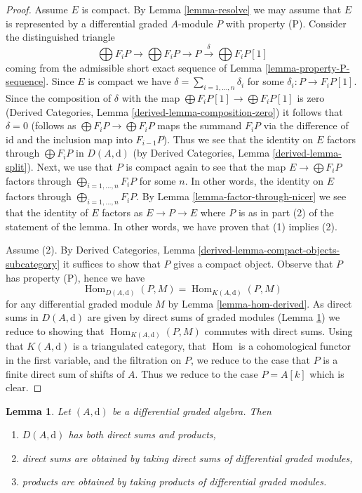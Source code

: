 \documentclass{stacks-project}
\theoremstyle{plain}
\newtheorem{lemma}[subsection]{Lemma}
\theoremstyle{definition}
\theoremstyle{remark}
\numberwithin{equation}{subsection}
\def\Hom{\mathop{\mathrm{Hom}}\nolimits}
\begin{document}
\begin{proof}
Assume $E$ is compact. By Lemma \ref{lemma-resolve} we may assume that $E$
is represented by a differential graded $A$-module $P$ with property (P).
Consider the distinguished triangle
$$
\bigoplus F_iP \to \bigoplus F_iP \to P
\xrightarrow{\delta} \bigoplus F_iP[1]
$$
coming from the admissible short exact sequence of
Lemma \ref{lemma-property-P-sequence}. Since $E$ is compact we have
$\delta = \sum_{i = 1, \ldots, n} \delta_i$ for some
$\delta_i : P \to F_iP[1]$. Since the composition of $\delta$
with the map $\bigoplus F_iP[1] \to \bigoplus F_iP[1]$ is zero
(Derived Categories, Lemma \ref{derived-lemma-composition-zero})
it follows that $\delta = 0$ (follows as $\bigoplus F_iP \to \bigoplus F_iP$
maps the summand $F_iP$ via the difference of $\text{id}$ and the inclusion
map into $F_{i - 1}P$).
Thus we see that the identity on $E$ factors through
$\bigoplus F_iP$ in $D(A, \text{d})$ (by
Derived Categories, Lemma \ref{derived-lemma-split}).
Next, we use that $P$ is compact again to see that the map
$E \to \bigoplus F_iP$ factors through $\bigoplus_{i = 1, \ldots, n} F_iP$
for some $n$. In other words, the identity on $E$ factors through
$\bigoplus_{i = 1, \ldots, n} F_iP$. By
Lemma \ref{lemma-factor-through-nicer}
we see that the identity of $E$ factors as $E \to P \to E$
where $P$ is as in part (2) of the statement of the lemma.
In other words, we have proven that (1) implies (2).

\medskip\noindent
Assume (2). By
Derived Categories, Lemma \ref{derived-lemma-compact-objects-subcategory}
it suffices to show that $P$ gives a compact object. Observe that
$P$ has property (P), hence we have
$$
\Hom_{D(A, \text{d})}(P, M) = \Hom_{K(A, \text{d})}(P, M)
$$
for any differential graded module $M$ by Lemma \ref{lemma-hom-derived}.
As direct sums in $D(A, \text{d})$ are given by direct sums of
graded modules (Lemma \ref{lemma-derived-products}) we reduce
to showing that $\Hom_{K(A, \text{d})}(P, M)$ commutes with direct
sums. Using that $K(A, \text{d})$ is a triangulated category,
that $\Hom$ is a cohomological functor in the first
variable, and the filtration on $P$, we reduce to the case that
$P$ is a finite direct sum of shifts of $A$. Thus we reduce to
the case $P = A[k]$ which is clear.
\end{proof}

\begin{lemma}
\label{lemma-derived-products}
Let $(A, \text{d})$ be a differential graded algebra. Then
\begin{enumerate}
\item $D(A, \text{d})$ has both direct sums and products,
\item direct sums are obtained by taking direct sums of differential graded
modules,
\item products are obtained by taking products of differential
graded modules.
\end{enumerate}
\end{lemma}
\end{document}
